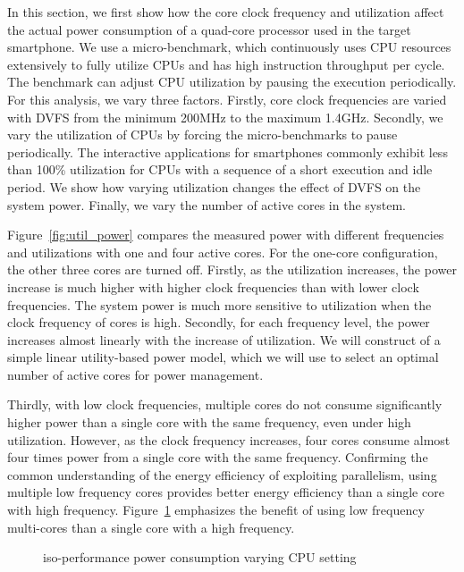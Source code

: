 In this section, we first show how the core clock frequency and utilization affect the actual power
consumption of a quad-core processor used in the target smartphone. 
We use a micro-benchmark, which continuously uses CPU resources extensively to fully utilize CPUs and has high instruction
throughput per cycle. The benchmark can adjust CPU utilization by pausing the execution periodically. 
For this analysis, we vary three factors. Firstly, core clock frequencies are varied with DVFS from
the minimum 200MHz to the maximum 1.4GHz. Secondly, we vary the utilization of CPUs by forcing
the micro-benchmarks to pause periodically. The interactive
applications for smartphones commonly exhibit less than 100\% utilization for CPUs with 
a sequence of a short execution and idle period. 
We show how varying utilization changes the effect of DVFS on the system power.
Finally, we vary the number of active cores in the system.

Figure~\ref{fig:util_power} compares the measured power with different frequencies and utilizations with
one and four active cores. For the one-core configuration, the other three cores are turned off.
Firstly, as the utilization increases, the power increase is much higher
with higher clock frequencies than with lower clock frequencies. The system power is much more sensitive to
utilization when the clock frequency of cores is high.
Secondly, for each frequency level, the power increases almost linearly with the increase of utilization.
We will construct of a simple linear utility-based power model, which we will use to select an optimal
number of active cores for power management.

Thirdly, with low clock frequencies,
multiple cores do not consume significantly higher power than a single core with the same frequency, even under high utilization.
However, as the clock frequency increases, four cores consume almost four times power from a single core with
the same frequency. Confirming the common understanding of the energy efficiency of exploiting parallelism, 
using multiple low frequency cores provides better energy efficiency than a single core with high frequency. 
Figure~\ref{fig:1cpu_vs_2cpu} emphasizes the benefit of using low frequency multi-cores than
a single core with a high frequency. 

\begin{figure}[bt]
\begin{center}
\end{center}
\caption{iso-performance power consumption varying CPU setting}
\vspace{-0.1in}
\label{fig:1cpu_vs_2cpu}
\end{figure}

